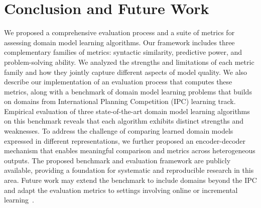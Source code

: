 \documentclass{article}
\newcommand{\miniparagraph}[1]{\textbf{#1.}}
\theoremstyle{definition}
\theoremstyle{remark}
\newcommand{\commentout}[1]{ }
\newif\ifaddcomments
\newcommand{\brendan}[1]{\ifaddcomments{\textcolor{brown}{[Brendan: {#1}]}}\fi}
\begin{document}
\section{Conclusion and Future Work}
We proposed a comprehensive evaluation process and a suite of metrics for assessing domain model learning algorithms. Our framework includes three complementary families of metrics: syntactic similarity, predictive power, and problem-solving ability. We analyzed the strengths and limitations of each metric family and how they jointly capture different aspects of model quality.
We also describe our implementation of an evaluation process that computes these metrics, along with a benchmark of domain model learning problems that builds on domains from International Planning Competition (IPC) learning track.
Empirical evaluation of three state-of-the-art domain model learning algorithms on this benchmark reveals that each algorithm exhibits distinct strengths and weaknesses.
To address the challenge of comparing learned domain models expressed in different representations, we further proposed an encoder-decoder mechanism that enables meaningful comparison and metrics across heterogeneous outputs.
The proposed benchmark and evaluation framework are publicly available, providing a foundation for systematic and reproducible research in this area.
Future work may extend the benchmark to include domains beyond the IPC and adapt the evaluation metrics to settings involving online or incremental learning~\citep{lamanna2021online, sreedharan2023optimistic, benyamin2025integratingreinforcementlearningaction, ng2019incremental, chitnis2021glib, jin2022creativity, verma2023autonomous, karia2023epistemic}. 


\commentout{
\miniparagraph{Online learning of domain models}
Here, the learning algorithm is required to learn a domain model by actively interacting with the environment~\citep{lamanna2021online, sreedharan2023optimistic, benyamin2025integratingreinforcementlearningaction, ng2019incremental, chitnis2021glib, jin2022creativity, verma2023autonomous, karia2023epistemic}. 
All the proposed metrics can be computed as-is, after a predefined number of iterations, for the online learning setting. 
However, an additional perspective that may be of interest in online learning of domain models are \emph{cumulative} metrics of the learning process, such as the number of actions performed for learning or the number of problems failed to solve while collecting observations.
Specific metrics and evaluation for online learning of domain models, however, is beyond the scope of this work. 
}
\end{document}
